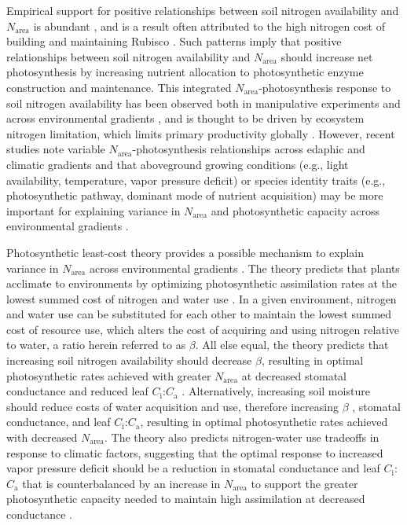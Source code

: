 Empirical support for positive relationships between soil nitrogen availability and $N_\mathrm{area}$ is abundant , and is a result often attributed to the high nitrogen cost of building and maintaining Rubisco . Such patterns imply that positive relationships between soil nitrogen availability and $N_\mathrm{area}$ should increase net photosynthesis by increasing nutrient allocation to photosynthetic enzyme construction and maintenance. This integrated $N_\mathrm{area}$-photosynthesis response to soil nitrogen availability has been observed both in manipulative experiments and across environmental gradients , and is thought to be driven by ecosystem nitrogen limitation, which limits primary productivity globally . However, recent studies note variable $N_\mathrm{area}$-photosynthesis relationships across edaphic and climatic gradients  and that aboveground growing conditions (e.g., light availability, temperature, vapor pressure deficit) or species identity traits (e.g., photosynthetic pathway, dominant mode of nutrient acquisition) may be more important for explaining variance in $N_\mathrm{area}$ and photosynthetic capacity across environmental gradients .

Photosynthetic least-cost theory provides a possible mechanism to explain variance in $N_\mathrm{area}$ across environmental gradients . The theory predicts that plants acclimate to environments by optimizing photosynthetic assimilation rates at the lowest summed cost of nitrogen and water use . In a given environment, nitrogen and water use can be substituted for each other to maintain the lowest summed cost of resource use, which alters the cost of acquiring and using nitrogen relative to water, a ratio herein referred to as $\beta$. All else equal, the theory predicts that increasing soil nitrogen availability should decrease $\beta$, resulting in optimal photosynthetic rates achieved with greater $N_\mathrm{area}$ at decreased stomatal conductance and reduced leaf $C_\mathrm{i}$:$C_\mathrm{a}$ . Alternatively, increasing soil moisture should reduce costs of water acquisition and use, therefore increasing $\beta$ , stomatal conductance, and leaf $C_\mathrm{i}$:$C_\mathrm{a}$, resulting in optimal photosynthetic rates achieved with decreased $N_\mathrm{area}$. The theory also predicts nitrogen-water use tradeoffs in response to climatic factors, suggesting that the optimal response to increased vapor pressure deficit should be a reduction in stomatal conductance and leaf $C_\mathrm{i}$:$C_\mathrm{a}$ that is counterbalanced by an increase in $N_\mathrm{area}$ to support the greater photosynthetic capacity needed to maintain high assimilation at decreased conductance .

